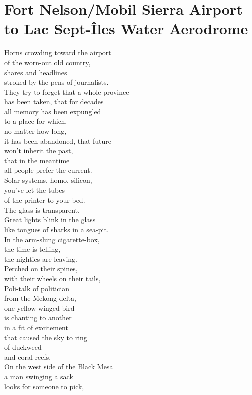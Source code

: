 \documentclass[smalldemyvopaper,11pt,twoside,onecolumn,openright,extrafontsizes]{memoir}
\begin{document}
\chapter{Fort Nelson/Mobil Sierra Airport to Lac Sept-Îles Water Aerodrome}
Horns crowding toward the airport
\\of the worn-out old country,
\\shares and headlines
\\stroked by the pens of journalists.
\\They try to forget that a whole province
\\has been taken, that for decades
\\all memory has been expungled
\\to a place for which,
\\no matter how long,
\\it has been abandoned, that future
\\won't inherit the past,
\\that in the meantime
\\all people prefer the current.
\\Solar systems, homo, silicon,
\\you've let the tubes
\\of the printer to your bed.
\\The glass is transparent.
\\Great lights blink in the glass
\\like tongues of sharks in a sea-pit.
\\In the arm-slung cigarette-box,
\\the time is telling,
\\the nighties are leaving.
\\Perched on their spines,
\\with their wheels on their tails,
\\Poli-talk of politician
\\from the Mekong delta,
\\one yellow-winged bird
\\is chanting to another
\\in a fit of excitement
\\that caused the sky to ring
\\of duckweed
\\and coral reefs.
\\On the west side of the Black Mesa
\\a man swinging a sack
\\looks for someone to pick,
\end{document}
